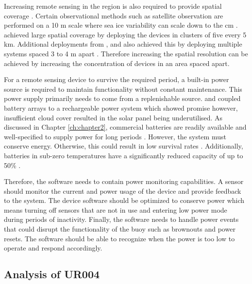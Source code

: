 Increasing remote sensing in the region is also required to provide spatial coverage \cite{albarello2020drift}. Certain observational methods such as satellite observation are performed on a 10 m scale \cite{galin2011validation} where sea ice variability can scale down to the cm \cite{vichi2019effects}. \textcite{doble2017robust} achieved large spatial coverage by deploying the devices in clusters of five every 5 km. Additional deployments from \cite{vichi2019effects}, \cite{kohout2015device} and \cite{albarello2020drift}
also achieved this by deploying multiple systems spaced 3 to 4 m apart \cite{vichi2019effects}. Therefore increasing the spatial resolution can be achieved by increasing the concentration of devices in an area spaced apart. \par 

For a remote sensing device to survive the required period, a built-in power source is required to maintain functionality without constant maintenance. This power supply primarily needs to come from a replenishable source. \textcite{doble2017robust} and \textcite{rabault2019open} coupled battery arrays to a rechargeable power system which showed promise however, insufficient cloud cover \cite{doble2017robust} resulted in the solar panel being underutilised. As discussed in Chapter \ref{ch:chapter2}, commercial batteries are readily available and well-specified to supply power for long periods \cite{rabault2017measurements}. However, the system must conserve energy. Otherwise, this could result in low survival rates \cite{kohout2015device}. Additionally, batteries in sub-zero temperatures have a significantly reduced capacity of up to 50\% \cite{doble2017robust}.

Therefore, the software needs to contain power monitoring capabilities. A sensor should monitor the current and power usage of the device and provide feedback to the system. The device software should be optimized to conserve power which means turning off sensors that are not in use and entering low power mode during periods of inactivity. Finally, the software needs to handle power events that could disrupt the functionality of the buoy such as brownouts and power resets. The software should be able to recognize when the power is too low to operate and respond accordingly.

\subsection{Analysis of UR004}

